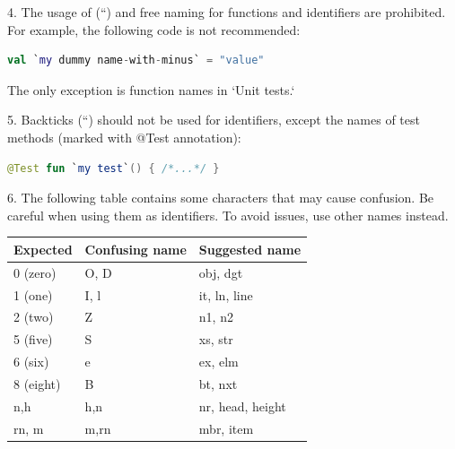 4.	The usage of (``) and free naming for functions and identifiers are prohibited. For example, the following code is not recommended:



\begin{lstlisting}[language=Kotlin]
val `my dummy name-with-minus` = "value"
\end{lstlisting}


The only exception is function names in `Unit tests.`



5.	Backticks (``) should not be used for identifiers, except the names of test methods (marked with @Test annotation):

\begin{lstlisting}[language=Kotlin]
 @Test fun `my test`() { /*...*/ }
\end{lstlisting}
6.  The following table contains some characters that may cause confusion. Be careful when using them as identifiers. To avoid issues, use other names instead.

\begin{center}

\begin{tabular}{ |p{}|p{}|p{}| }

\hline

Expected&Confusing name&Suggested name\\

\hline

 0 (zero)      & O, D                     & obj, dgt         \\

 1 (one)       & I, l                     & it, ln, line     \\

 2 (two)       & Z                        & n1, n2           \\

 5 (five)      & S                        & xs, str          \\

 6 (six)       & e                        & ex, elm          \\

 8 (eight)     & B                        & bt, nxt          \\

 n,h           & h,n                      & nr, head, height \\

 rn, m         & m,rn                     & mbr, item        \\

\hline

\end{tabular}

\end{center}

